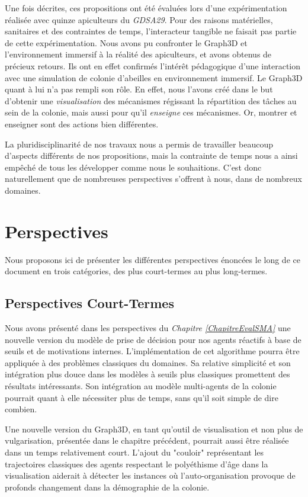 Une fois décrites, ces propositions ont été évaluées lors d'une expérimentation réalisée avec quinze apiculteurs du \textit{GDSA29}. Pour des raisons matérielles, sanitaires et des contraintes de temps, l'interacteur tangible ne faisait pas partie de cette expérimentation. Nous avons pu confronter le Graph3D et l'environnement immersif à la réalité des apiculteurs, et avons obtenus de précieux retours. Ils ont en effet confirmés l'intérêt pédagogique d'une interaction avec une simulation de colonie d'abeilles en environnement immersif. Le Graph3D quant à lui n'a pas rempli son rôle. En effet, nous l'avons créé dans le but d'obtenir une \textit{visualisation} des mécanismes régissant la répartition des tâches au sein de la colonie, mais aussi pour qu'il \textit{enseigne} ces mécanismes. Or, montrer et enseigner sont des actions bien différentes.
	
	 La pluridisciplinarité de nos travaux nous a permis de travailler beaucoup d'aspects différents de nos propositions, mais la contrainte de temps nous a ainsi empêché de tous les développer comme nous le souhaitions. C'est donc naturellement que de nombreuses perspectives s'offrent à nous, dans de nombreux domaines.
	
\section*{Perspectives}
	Nous proposons ici de présenter les différentes perspectives énoncées le long de ce document en trois catégories, des plus court-termes au plus long-termes.
	
	\subsection*{Perspectives Court-Termes}	
	Nous avons présenté dans les perspectives du \textit{Chapitre \ref{ChapitreEvalSMA}} une nouvelle version du modèle de prise de décision pour nos agents réactifs à base de seuils et de motivations internes. L'implémentation de cet algorithme pourra être appliquée à des problèmes classiques du domaines. Sa relative simplicité et son intégration plus douce dans les modèles à seuils plus classiques promettent des résultats intéressants. Son intégration au modèle multi-agents de la colonie pourrait quant à elle nécessiter plus de temps, sans qu'il soit simple de dire combien.
	
	Une nouvelle version du Graph3D, en tant qu'outil de visualisation et non plus de vulgarisation, présentée dans le chapitre précédent, pourrait aussi être réalisée dans un temps relativement court. L'ajout du "couloir" représentant les trajectoires classiques des agents respectant le polyéthisme d'âge dans la visualisation aiderait à détecter les instances où l'auto-organisation provoque de profonds changement dans la démographie de la colonie.
	
